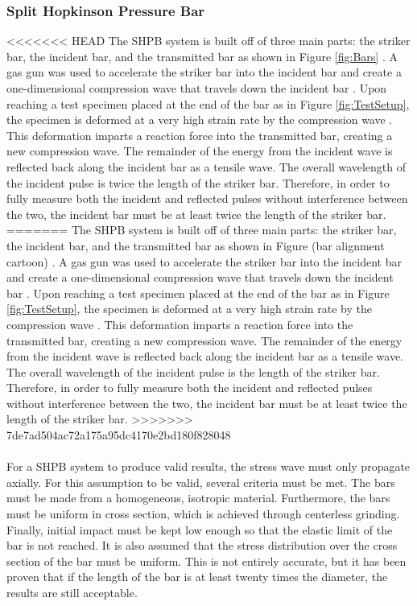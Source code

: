 \documentclass[12pt]{article}
\begin{document}
\subsubsection {Split Hopkinson Pressure Bar} %
<<<<<<< HEAD
The SHPB system is built off of three main parts: the striker bar, the incident bar, and the transmitted bar as shown in Figure \ref{fig:Bars} \cite{Frew2002} \cite{Follansbee} \cite{Frew}. A gas gun was used to accelerate the striker bar into the incident bar and create a one-dimensional compression wave that travels down the incident bar \cite{Frew}. Upon reaching a test specimen placed at the end of the bar as in Figure \ref{fig:TestSetup}, the specimen is deformed at a very high strain rate by the compression wave \cite{Dai}. This deformation imparts a reaction force into the transmitted bar, creating a new compression wave. The remainder of the energy from the incident wave is reflected back along the incident bar as a tensile wave. The overall wavelength of the incident pulse is twice the length of the  striker bar. Therefore, in order to fully measure both the incident and reflected pulses without interference between the two, the incident bar must be at least twice the length of the striker bar.
=======
The SHPB system is built off of three main parts: the striker bar, the incident bar, and the transmitted bar as shown in Figure (bar alignment cartoon) \cite{Frew2002} \cite{Follansbee} \cite{Frew}. A gas gun was used to accelerate the striker bar into the incident bar and create a one-dimensional compression wave that travels down the incident bar \cite{Frew}. Upon reaching a test specimen placed at the end of the bar as in Figure \ref{fig:TestSetup}, the specimen is deformed at a very high strain rate by the compression wave \cite{Dai}. This deformation imparts a reaction force into the transmitted bar, creating a new compression wave. The remainder of the energy from the incident wave is reflected back along the incident bar as a tensile wave. The overall wavelength of the incident pulse is the length of the striker bar. Therefore, in order to fully measure both the incident and reflected pulses without interference between the two, the incident bar must be at least twice the length of the striker bar.
>>>>>>> 7de7ad504ac72a175a95dc4170e2bd180f828048
\\ \\
For a SHPB system to produce valid results, the stress wave must only propagate axially. For this assumption to be valid, several criteria must be met. The bars must be made from a homogeneous, isotropic material. Furthermore, the bars must be uniform in cross section, which is achieved through centerless grinding. Finally, initial impact must be kept low enough so that the elastic limit of the bar is not reached. It is also assumed that the stress distribution over the cross section of the bar must be uniform. This is not entirely accurate, but it has been proven that if the length of the bar is at least twenty times the diameter, the results are still acceptable. 
\end{document}
